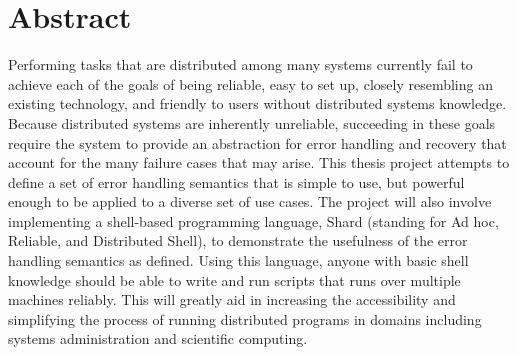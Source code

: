 \documentclass[twoside]{report}
\begin{document}



\tableofcontents
\listoffigures
\listoftables
\onehalfspacing

\chapter*{Abstract}

Performing tasks that are distributed among many systems currently fail to achieve each of the goals of being reliable, easy to set up, closely resembling an existing technology, and friendly to users without distributed systems knowledge.
Because distributed systems are inherently unreliable, succeeding in these goals require the system to provide an abstraction for error handling and recovery that account for the many failure cases that may arise.
This thesis project attempts to define a set of error handling semantics that is simple to use, but powerful enough to be applied to a diverse set of use cases.
The project will also involve implementing a shell-based programming language, Shard (standing for Ad hoc, Reliable, and Distributed Shell), to demonstrate the usefulness of the error handling semantics as defined.
Using this language, anyone with basic shell knowledge should be able to write and run scripts that runs over multiple machines reliably.
This will greatly aid in increasing the accessibility and simplifying the process of running distributed programs in domains including systems administration and scientific computing.
\end{document}
